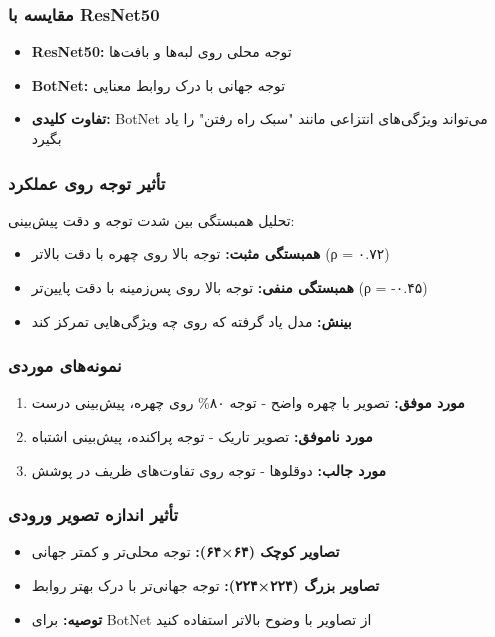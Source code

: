 \documentclass[12pt,a4paper]{article}
\theoremstyle{definition}
\begin{document}
\subsubsection*{مقایسه با ResNet50}
\begin{itemize}
    \item \textbf{ResNet50:} توجه محلی روی لبه‌ها و بافت‌ها
    \item \textbf{BotNet:} توجه جهانی با درک روابط معنایی
    \item \textbf{تفاوت کلیدی:} BotNet می‌تواند ویژگی‌های انتزاعی مانند "سبک راه رفتن" را یاد بگیرد
\end{itemize}

\subsubsection*{تأثیر توجه روی عملکرد}
تحلیل همبستگی بین شدت توجه و دقت پیش‌بینی:

\begin{itemize}
    \item \textbf{همبستگی مثبت:} توجه بالا روی چهره با دقت بالاتر (ρ = ۰.۷۲)
    \item \textbf{همبستگی منفی:} توجه بالا روی پس‌زمینه با دقت پایین‌تر (ρ = -۰.۴۵)
    \item \textbf{بینش:} مدل یاد گرفته که روی چه ویژگی‌هایی تمرکز کند
\end{itemize}

\subsubsection*{نمونه‌های موردی}
\begin{enumerate}
    \item \textbf{مورد موفق:} تصویر با چهره واضح - توجه ۸۰\% روی چهره، پیش‌بینی درست
    \item \textbf{مورد ناموفق:} تصویر تاریک - توجه پراکنده، پیش‌بینی اشتباه
    \item \textbf{مورد جالب:} دوقلوها - توجه روی تفاوت‌های ظریف در پوشش
\end{enumerate}

\subsubsection*{تأثیر اندازه تصویر ورودی}
\begin{itemize}
    \item \textbf{تصاویر کوچک (۶۴×۶۴):} توجه محلی‌تر و کمتر جهانی
    \item \textbf{تصاویر بزرگ (۲۲۴×۲۲۴):} توجه جهانی‌تر با درک بهتر روابط
    \item \textbf{توصیه:} برای BotNet از تصاویر با وضوح بالاتر استفاده کنید
\end{itemize}
\end{document}

